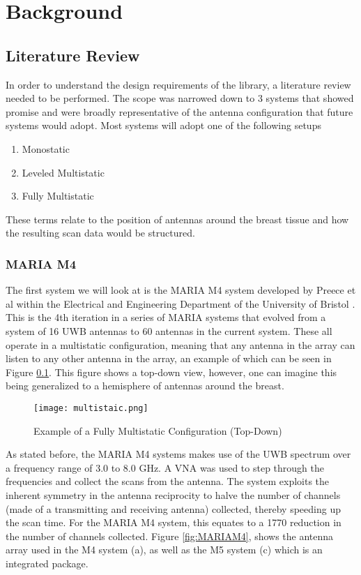 \chapter*{Background}
\section{Literature Review}
In order to understand the design requirements of the library, a literature review needed to be performed. The scope was
narrowed down to 3 systems that showed promise and were broadly representative of the antenna configuration that future
systems would adopt. Most systems will adopt one of the following setups
\begin{enumerate}
    \item Monostatic
    \item Leveled Multistatic
    \item Fully Multistatic
\end{enumerate}
\noindent These terms relate to the position of antennas around the breast tissue and how the resulting scan data would
be structured. \hfill \break

\subsection{MARIA M4}
The first system we will look at is the MARIA M4 system developed by Preece et al within the Electrical and Engineering
Department of the University of Bristol \cite{preeceMARIAM4Clinical2016}. This is the 4th iteration in a series of MARIA systems that evolved from a
system of 16 UWB antennas to 60 antennas in the current system. These all operate in a multistatic configuration,
meaning that any antenna in the array can listen to any other antenna in the array, an example of which can be seen in
Figure \ref{fig:MultistaticExample}. This figure shows a top-down view, however, one can imagine this being generalized
to a hemisphere of antennas around the breast. \hfill

\begin{figure}
    \texttt{[image: multistaic.png]}
    \centering
    \caption{Example of a Fully Multistatic Configuration (Top-Down)}
    \label{fig:MultistaticExample}
\end{figure}

\noindent As stated before, the MARIA M4 systems makes use of the UWB spectrum over a frequency range of 3.0 to 8.0 GHz. A
VNA was used to step through the frequencies and collect the scans from the antenna. The system exploits the inherent
symmetry in the antenna reciprocity to halve the number of channels (made of a transmitting and receiving antenna)
collected, thereby speeding up the scan time. For the MARIA M4 system, this equates to a 1770 reduction in the number of
channels collected. Figure \ref{fig:MARIAM4}, shows the antenna array used in the M4 system (a), as well as the M5
system (c) which is an integrated package.


